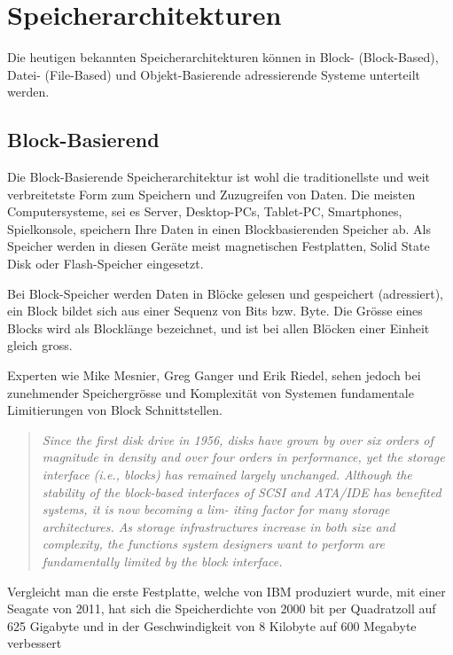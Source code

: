 \cleardoublepage
\chapter{Speicherarchitekturen}

Die heutigen bekannten Speicherarchitekturen können in Block- (Block-Based), Datei- (File-Based) und Objekt-Basierende adressierende Systeme unterteilt werden.

\section{Block-Basierend}
Die Block-Basierende Speicherarchitektur ist wohl die traditionellste und weit verbreitetste Form zum Speichern und Zuzugreifen von Daten. Die meisten Computersysteme, sei es Server, Desktop-PCs, Tablet-PC, Smartphones, Spielkonsole, speichern Ihre Daten in einen Blockbasierenden Speicher ab. Als Speicher werden in diesen Geräte meist magnetischen Festplatten, Solid State Disk oder Flash-Speicher eingesetzt.

Bei Block-Speicher werden Daten in Blöcke gelesen und gespeichert (adressiert), ein Block bildet sich aus einer Sequenz von Bits bzw. Byte. Die Grösse eines Blocks wird als Blocklänge bezeichnet, und ist bei allen Blöcken einer Einheit gleich gross. 

Experten wie Mike Mesnier, Greg Ganger und Erik Riedel, sehen jedoch bei zunehmender Speichergrösse und Komplexität von Systemen fundamentale Limitierungen von Block Schnittstellen.

\begin{quotation}
\em Since the first disk drive in 1956, disks have grown by over six orders of magnitude in density and over four orders in performance, yet the storage interface (i.e., blocks) has remained largely unchanged. Although the stability of the block-based interfaces of SCSI and ATA/IDE has benefited systems, it is now becoming a lim- iting factor for many storage architectures. As storage infrastructures increase in both size and complexity, the functions system designers want to perform are fundamentally limited by the block interface. \end{quotation}\cite{Mesnier2003}

Vergleicht man die erste Festplatte, welche von IBM produziert wurde, mit einer Seagate von 2011, hat sich die Speicherdichte von 2000 bit per Quadratzoll auf 625 Gigabyte und in der Geschwindigkeit von 8 Kilobyte auf 600 Megabyte verbessert\cite{Seagate2011}\cite{Seagate2011a}

